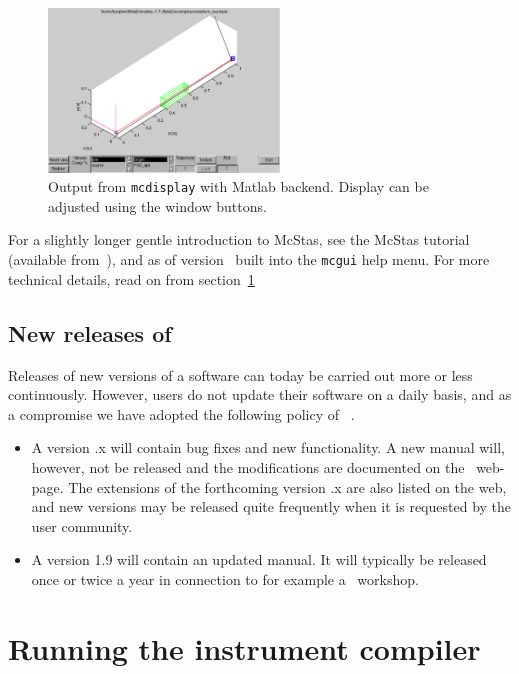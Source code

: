 \begin{figure}[htb!]
  \begin{center}
    \includegraphics[width=0.55\textwidth]{figures/mcdisplay_Matlab.eps}
  \end{center}
\caption{Output from \texttt{mcdisplay} with Matlab backend. Display
  can be adjusted using the window buttons.}
\label{fig:mcdisp_Matlab}
\end{figure}

For a slightly longer gentle introduction to McStas, see the McStas
tutorial (available from~\cite{mcstas_webpage}), and as of version
\version\ built into the \verb+mcgui+ help menu. For more technical
details, read on from section~\ref{s:running}

\subsection{New releases of \MCS}
Releases of new versions of a software can today be carried out more or less
continuously. However, users do not update their software on a daily basis,
and as a compromise we have adopted the following policy of \MCS\ .

\begin{itemize}
\item A version {\version}.x will contain bug fixes and new functionality. A new manual
will, however, not be released and the modifications are documented on the
\MCS\ web-page. The extensions of the forthcoming version {\version}.x are also listed
on the web, and new versions may be released quite frequently when it is requested
by the user community.
\item A version 1.9 will contain an updated manual. It will typically be released
once or twice a year in connection to for example a \MCS\ workshop.
\end{itemize}

\section{Running the instrument compiler}
\label{s:running}

